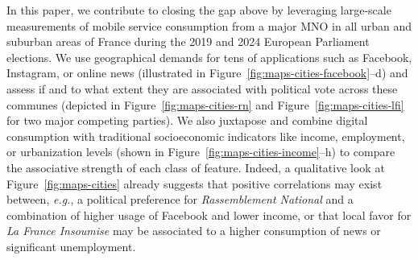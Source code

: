 \documentclass[9pt,sigconf,letterpaper]{acmart}
\newcommand{\eg}{\textit{e.g.},\xspace}
\newcommand{\RN}{\textsl{Rassemblement National}\xspace}
\newcommand{\LFI}{\textsl{La France Insoumise}\xspace}
\begin{document}
In this paper, we contribute to closing the gap above by leveraging large-scale measurements of mobile service consumption from a major \ac{MNO} in all urban and suburban areas of France during the 2019 and 2024 European Parliament elections. 
We use geographical demands for tens of applications such as Facebook, Instagram, or online news (illustrated in Figure~\ref{fig:maps-cities-facebook}--d) and assess if and to what extent they are associated with political vote across these communes (depicted in Figure~\ref{fig:maps-cities-rn} and Figure~\ref{fig:maps-cities-lfi} for two major competing parties).
We also juxtapose and combine digital consumption with traditional socioeconomic indicators like income, employment, or urbanization levels (shown in Figure~\ref{fig:maps-cities-income}--h) to compare the associative strength of each class of feature.
Indeed, a qualitative look at Figure~\ref{fig:maps-cities} already suggests that positive correlations may exist between, \eg a political preference for \RN and a combination of higher usage of Facebook and lower income, or that local favor for \LFI may be associated to a higher consumption of news or significant unemployment.
\end{document}
